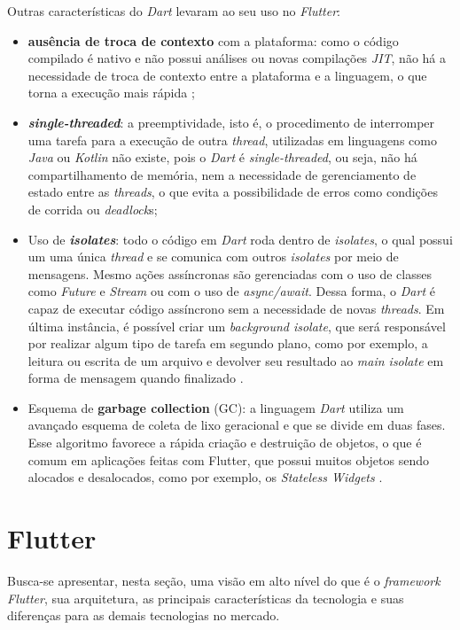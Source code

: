 Outras características do \textit{Dart} levaram ao seu uso no \textit{Flutter}:

\begin{itemize}
  \item \textbf{ausência de troca de contexto} com a plataforma: como o código compilado é nativo e não possui análises ou novas compilações \textit{JIT}, não há a necessidade de troca de contexto entre a plataforma e a linguagem, o que torna a execução mais rápida \cite{leler2017flutterdart};
  \item \textbf{\textit{single-threaded}}: a preemptividade, isto é, o procedimento de interromper uma tarefa para a execução de outra \textit{thread}, utilizadas em linguagens como \textit{Java} ou \textit{Kotlin} não existe, pois o \textit{Dart} é \textit{single-threaded}, ou seja, não há compartilhamento de memória, nem a necessidade de gerenciamento de estado entre as \textit{threads}, o que evita a possibilidade de erros como condições de corrida ou \textit{deadlock}s;
  \item Uso de \textbf{\textit{isolates}}: todo o código em \textit{Dart} roda dentro de \textit{isolates}, o qual possui um uma única \textit{thread} e se comunica com outros \textit{isolates} por meio de mensagens. Mesmo ações assíncronas são gerenciadas com o uso de classes como \textit{Future} e \textit{Stream} ou com o uso de \textit{async/await}. Dessa forma, o \textit{Dart} é capaz de executar código assíncrono sem a necessidade de novas \textit{threads}. Em última instância, é possível criar um \textit{background isolate}, que será responsável por realizar algum tipo de tarefa em segundo plano, como por exemplo, a leitura ou escrita de um arquivo e devolver seu resultado ao \textit{main isolate} em forma de mensagem quando finalizado \cite{dart-language} \cite{dart-concurrency}.
  \item Esquema de \textbf{garbage collection} (GC): a linguagem \textit{Dart} utiliza um avançado esquema de coleta de lixo geracional e que se divide em duas fases. Esse algoritmo favorece a rápida criação e destruição de objetos, o que é comum em aplicações feitas com Flutter, que possui muitos objetos sendo alocados e desalocados, como por exemplo, os \textit{Stateless Widgets} \cite{leler2017flutterdart} \cite{matt2019garbagecollector}.
\end{itemize}


\section[\textit{Flutter}]{Flutter}
Busca-se apresentar, nesta seção, uma visão em alto nível do que é o \textit{framework Flutter}, sua arquitetura, as principais características da tecnologia e suas diferenças para as demais tecnologias no mercado.

